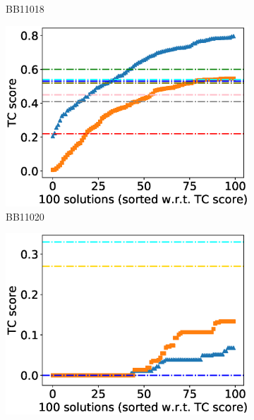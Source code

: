 \begin{figure}[!htbp]
\begin{adjustwidth}{-1cm}{-1cm}
\begin{subfigure}[b]{0.26\textwidth}
			\caption{BB11018}
		\end{subfigure}
		\begin{subfigure}[b]{0.26\textwidth}
			\includegraphics[width=\columnwidth]{Figure/summary/precomputedInit/Balibase/BB11020_tc_density_single_run_2}
			\caption{BB11020}
		\end{subfigure}
		\begin{subfigure}[b]{0.26\textwidth}
			\includegraphics[width=\columnwidth]{Figure/summary/precomputedInit/Balibase/BB11033_tc_density_single_run_2}

\end{subfigure}
\end{adjustwidth}
\end{figure}
